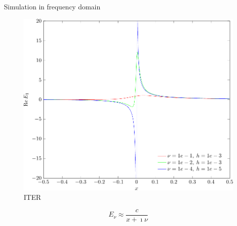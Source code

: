 \begin{frame}{Simulation in frequency domain}

 \begin{minipage}{0.7\linewidth}
 \begin{figure}
       		\includegraphics[scale = 0.6]{./images/picture2}
       	\caption{ITER}
     	 \end{figure} 
\end{minipage}
\hfill
\begin{minipage}{0.25\linewidth}
\[
E_\nu \approx \frac{c}{x + \imath \nu}
\]
\end{minipage}
\end{frame}
 {
\begin{frame}
\begin{center}
\textcolor{lightred}{}
\end{center}
\end{frame}}
